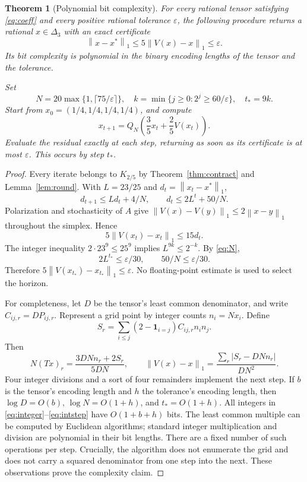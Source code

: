 \documentclass[11pt]{amsart}
\newtheorem{theorem}{Theorem}[section]
\theoremstyle{definition}
\newcommand{\D}{\Delta_3}
\newcommand{\norm}[1]{\left\lVert#1\right\rVert_1}
\begin{document}
\begin{theorem}[Polynomial bit complexity]\label{thm:algorithm}
For every rational tensor satisfying \eqref{eq:coeff} and every positive rational tolerance $\varepsilon$, the following procedure returns a rational $x\in\D$ with an exact certificate
\[
 \norm{x-x^*}\le5\norm{V(x)-x}\le\varepsilon.
\]
Its bit complexity is polynomial in the binary encoding lengths of the tensor and the tolerance.

Set
\begin{equation}\label{eq:N}
 N=20\max\{1,\lceil75/\varepsilon\rceil\},\quad
 k=\min\{j\ge0:2^j\ge60/\varepsilon\},\quad t_*=9k.
\end{equation}
Start from $x_0=(1/4,1/4,1/4,1/4)$, and compute
\begin{equation}\label{eq:rounded}
 x_{t+1}=Q_N\left(\frac35x_t+\frac25V(x_t)\right).
\end{equation}
Evaluate the residual exactly at each step, returning as soon as its certificate is at most $\varepsilon$. This occurs by step $t_*$.
\end{theorem}
\begin{proof}
Every iterate belongs to $K_{2/5}$ by Theorem~\ref{thm:contract} and Lemma~\ref{lem:round}. With $L=23/25$ and $d_t=\norm{x_t-x^*}$,
\[
 d_{t+1}\le Ld_t+4/N,\qquad
 d_t\le2L^t+50/N.
\]
Polarization and stochasticity of $A$ give $\norm{V(x)-V(y)}\le2\norm{x-y}$ throughout the simplex. Hence
\[
 5\norm{V(x_t)-x_t}\le15d_t.
\]
The integer inequality $2\cdot23^9\le25^9$ implies $L^{9k}\le2^{-k}$. By \eqref{eq:N},
\[
 2L^{t_*}\le\varepsilon/30,\qquad 50/N\le\varepsilon/30.
\]
Therefore $5\norm{V(x_{t_*})-x_{t_*}}\le\varepsilon$. No floating-point estimate is used to select the horizon.

For completeness, let $D$ be the tensor's least common denominator, and write $C_{ij,r}=DP_{ij,r}$. Represent a grid point by integer counts $n_i=Nx_i$. Define
\begin{equation}\label{eq:integer}
 S_r=\sum_{i\le j}(2-\mathbf1_{i=j})C_{ij,r}n_in_j.
\end{equation}
Then
\begin{equation}\label{eq:intstep}
 N(Tx)_r=\frac{3DNn_r+2S_r}{5DN},\qquad
 \norm{V(x)-x}=\frac{\sum_r|S_r-DNn_r|}{DN^2}.
\end{equation}
Four integer divisions and a sort of four remainders implement the next step. If $b$ is the tensor's encoding length and $h$ the tolerance's encoding length, then $\log D=O(b)$, $\log N=O(1+h)$, and $t_*=O(1+h)$. All integers in \eqref{eq:integer}--\eqref{eq:intstep} have $O(1+b+h)$ bits. The least common multiple can be computed by Euclidean algorithms; standard integer multiplication and division are polynomial in their bit lengths. There are a fixed number of such operations per step. Crucially, the algorithm does not enumerate the grid and does not carry a squared denominator from one step into the next. These observations prove the complexity claim.
\end{proof}
\end{document}
